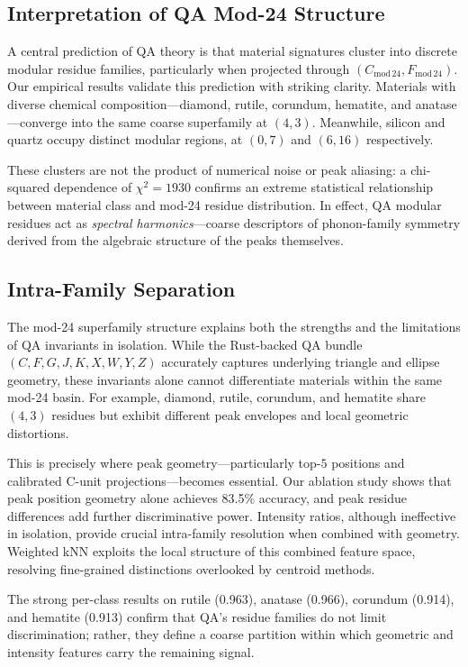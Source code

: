 \documentclass[12pt]{article}
\begin{document}
\subsection{Interpretation of QA Mod-24 Structure}

A central prediction of QA theory is that material signatures cluster into discrete modular residue families,
particularly when projected through $(C_{\mathrm{mod}\,24},F_{\mathrm{mod}\,24})$.  
Our empirical results validate this prediction with striking clarity. Materials with diverse chemical 
composition—diamond, rutile, corundum, hematite, and anatase—converge into the same coarse
superfamily at $(4,3)$. Meanwhile, silicon and quartz occupy distinct modular regions, at $(0,7)$ and 
$(6,16)$ respectively.  

These clusters are not the product of numerical noise or peak aliasing: a chi-squared dependence of
$\chi^2 = 1930$ confirms an extreme statistical relationship between material class and mod-24 residue
distribution. In effect, QA modular residues act as \emph{spectral harmonics}—coarse descriptors of 
phonon-family symmetry derived from the algebraic structure of the peaks themselves.

\subsection{Intra-Family Separation}

The mod-24 superfamily structure explains both the strengths and the limitations of QA invariants in 
isolation. While the Rust-backed QA bundle $(C, F, G, J, K, X, W, Y, Z)$ accurately captures underlying 
triangle and ellipse geometry, these invariants alone cannot differentiate materials within the same 
mod-24 basin. For example, diamond, rutile, corundum, and hematite share $(4,3)$ residues but exhibit 
different peak envelopes and local geometric distortions.

This is precisely where peak geometry—particularly top-$5$ positions and calibrated C-unit projections—becomes essential.  
Our ablation study shows that peak position geometry alone achieves 83.5\% accuracy, and peak residue
differences add further discriminative power. Intensity ratios, although ineffective in isolation, provide 
crucial intra-family resolution when combined with geometry. Weighted kNN exploits the local structure of 
this combined feature space, resolving fine-grained distinctions overlooked by centroid methods.

The strong per-class results on rutile (0.963), anatase (0.966), corundum (0.914), and hematite (0.913) 
confirm that QA’s residue families do not limit discrimination; rather, they define a coarse partition 
within which geometric and intensity features carry the remaining signal.
\end{document}
